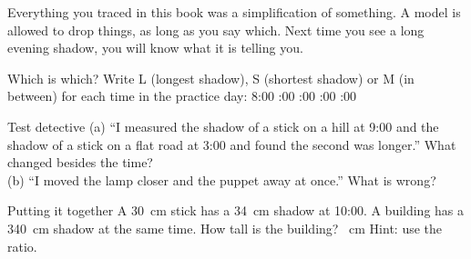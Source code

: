 \begin{multix}[wow]\multixbot[wow]\tcblower
Everything you traced in this book was a simplification of something. A model is allowed to drop things, as long as you say which. Next time you see a long evening shadow, you will know what it is telling you.
\end{multix}
\clearpage
\thispagestyle{fancy}
\begin{puzzle}{Which is which?}
Write L (longest shadow), S (shortest shadow) or M (in between) for each time in the practice day: 8:00 :00 :00 :00 :00 \wline[1cm]
\end{puzzle}

\begin{puzzle}{Test detective}
(a) ``I measured the shadow of a stick on a hill at 9:00 and the shadow of a stick on a flat road at 3:00 and found the second was longer.'' What changed besides the time? \wline[4cm]\\
(b) ``I moved the lamp closer and the puppet away at once.'' What is wrong? \wline[4cm]
\end{puzzle}

\begin{puzzle}{Putting it together}
A 30~cm stick has a 34~cm shadow at 10:00. A building has a 340~cm shadow at the same time. How tall is the building? \wline[1.6cm]~cm \quad Hint: use the ratio.
\end{puzzle}


